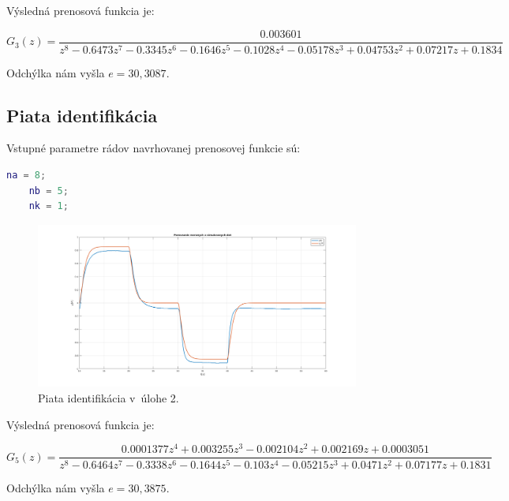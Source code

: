 \documentclass{article}
\begin{document}
Výsledná prenosová funkcia je:

\begin{equation}
	G_3(z) = \frac{0.003601}{z^8 - 0.6473 z^7 - 0.3345 z^6 - 0.1646 z^5 - 0.1028 z^4 - 0.05178 z^3 + 0.04753 z^2 + 0.07217 z + 0.1834}
	\label{eq:I4}
\end{equation}

Odchýlka nám vyšla $e = 30,3087$.

\clearpage

\subsection{Piata identifikácia}
\label{subsec:I5}

Vstupné parametre rádov navrhovanej prenosovej funkcie sú:

\begin{lstlisting}[language=Matlab]
	na = 8;
	nb = 5;
	nk = 1;
\end{lstlisting}

\begin{figure}[!htbp]
	\begin{center}
		\includegraphics[width=0.95\textwidth]{include/I5.png}
	\end{center}
	\caption{Piata identifikácia v~úlohe 2.}
	\label{fig:I5}
\end{figure}

Výsledná prenosová funkcia je:

\begin{equation}
	G_5(z) = \frac{0.0001377 z^4 + 0.003255 z^3 - 0.002104 z^2 + 0.002169 z + 0.0003051}{z^8 - 0.6464 z^7 - 0.3338 z^6 - 0.1644 z^5 - 0.103 z^4 - 0.05215 z^3 + 0.0471 z^2 + 0.07177 z + 0.1831}
	\label{eq:I5}
\end{equation}

Odchýlka nám vyšla $e = 30,3875$.

\clearpage
\end{document}
